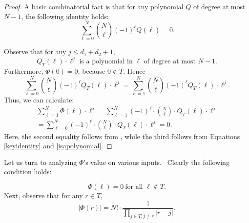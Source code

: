 \begin{proof}
A basic combinatorial fact is that for any polynomial $Q$ of degree at most $N-1$,
the following identity holds:
\begin{equation} 
\label{keyidentity} 
\sum_{\ell=0}^N \binom{N}{\ell} (-1)^\ell Q(\ell) = 0.
\end{equation}

Observe that for any $j \leq d_1 + d_2+1$,
\begin{equation} \label{isapolynomial}  
Q_T(\ell) \cdot \ell^j  \text{ is a polynomial in } \ell \text{ of degree at most } N-1. 
\end{equation}
Furthermore, $\Phi(0)=0$, because $0 \not\in T$. Hence
\begin{equation} \label{nozeroterm} 
\sum_{\ell=0}^N \binom{N}{\ell} (-1)^\ell Q_T(\ell) \cdot \ell^j= \sum_{\ell=1}^N \binom{N}{\ell} (-1)^\ell Q_T(\ell) \cdot \ell^j. 
\end{equation}
Thus, we can calculate:
\begin{eqnarray*}
\sum_{\ell=1}^N \Phi(\ell) \cdot \ell^{j} = \sum_{\ell=1}^N (-1)^{\ell} \cdot \binom{N}{\ell} \cdot Q_T(\ell) \cdot \ell^j\\
= \sum_{\ell=0}^N (-1)^\ell \cdot \binom{N}{\ell} \cdot Q_T(\ell) \cdot \ell^j
=0.
\end{eqnarray*}
Here, the second equality follows from , while the third follows
from Equations \eqref{keyidentity} and \eqref{isapolynomial}.
\end{proof}

Let us turn to analyzing $\Phi $'s value on various inputs. \ Clearly the
following condition holds:

\begin{equation}
\Phi (\ell )=0~\text{for all }\ell \not\in T\text{.}  \label{zeros}
\end{equation}
Next, observe that for any $r\in T$,
\begin{equation*}
\left\vert \Phi (r)\right\vert =N!\cdot \frac{1}{\prod_{j\in T,j\neq r}|r-j|}
.
\end{equation*}

